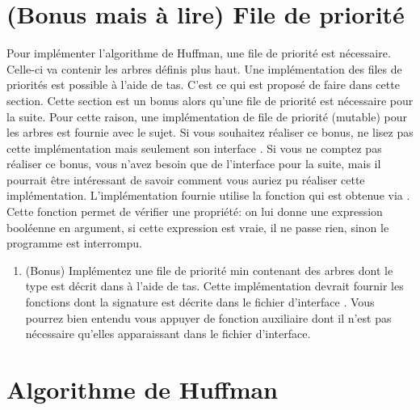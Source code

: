 \documentclass[a4paper, 10pt]{article}
\begin{document}
\section{(Bonus mais à lire) File de priorité}
Pour implémenter l'algorithme de Huffman, une file de priorité est nécessaire. Celle-ci va contenir les arbres définis plus haut.
Une implémentation des files de priorités est possible à l'aide de tas. C'est ce qui est proposé de faire dans cette section.
Cette section est un bonus alors qu'une file de priorité est nécessaire pour la suite.
Pour cette raison, une implémentation de file de priorité (mutable) pour les arbres est fournie avec le sujet. Si vous souhaitez réaliser ce bonus, ne lisez pas cette implémentation mais seulement son interface . Si vous ne comptez pas réaliser ce bonus, vous n'avez besoin que de l'interface pour la suite, mais il pourrait être intéressant de savoir comment vous auriez pu réaliser cette implémentation.
L'implémentation fournie utilise la fonction  qui est obtenue via . Cette fonction permet de vérifier une propriété: on lui donne une expression booléenne en argument, si cette expression est vraie, il ne passe rien, sinon le programme est interrompu.
\begin{enumerate}[resume]
\item (Bonus) Implémentez une file de priorité min contenant des arbres dont le type est décrit dans  à l'aide de tas. Cette implémentation devrait fournir les fonctions dont la signature est décrite dans le fichier d'interface . Vous pourrez bien entendu vous appuyer de fonction auxiliaire dont il n'est pas nécessaire qu'elles apparaissant dans le fichier d'interface.
\end{enumerate}

\section{Algorithme de Huffman}
\end{document}

